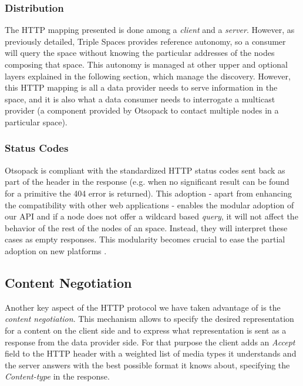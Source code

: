 \subsubsection{Distribution}

The HTTP mapping presented is done among a \textit{client} and a \textit{server}.
However, as previously detailed, Triple Spaces provides reference autonomy, so a consumer will query the space without knowing the particular addresses of the nodes composing that space.
This autonomy is managed at other upper and optional layers explained in the following section, which manage the discovery.
However, this HTTP mapping is all a data provider needs to serve information in the space, and it is also what a data consumer needs to interrogate a multicast provider (a component provided by Otsopack to contact multiple nodes in a particular space).

\subsubsection{Status Codes}
Otsopack is compliant with the standardized HTTP status codes sent back as part of the header in the response (e.g. when no significant result can be found for a primitive the 404 error is returned).
This adoption - apart from enhancing the compatibility with other web applications - enables the modular adoption of our API and if a node does not offer a wildcard based \textit{query}, it will not affect the behavior of the rest of the nodes of an space.
Instead, they will interpret these cases as empty responses.
This modularity becomes crucial to ease the partial adoption on new platforms \cite{gomez-goiri_collaboration_2011}.

\subsection{Content Negotiation}
Another key aspect of the HTTP protocol we have taken advantage of is the \textit{content negotiation}.
This mechanism allows to specify the desired representation for a content on the client side and to express what representation is sent as a response from the data provider side.
For that purpose the client adds an \textit{Accept} field to the HTTP header with a weighted list of media types it understands and the server answers with the best possible format it knows about, specifying the \textit{Content-type} in the response.

